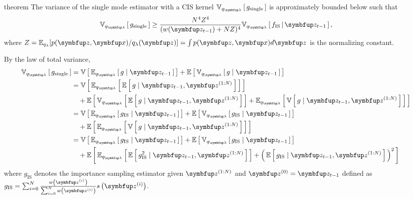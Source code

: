 
\begin{theoremEnd}{theorem}\label{thm:approx_var}
  The variance of the single mode estimator with a CIS kernel $\Vsub{q_{\vlambda}}{g_{\mathrm{single}}}$ is approximately bounded below such that
  \begin{align}
    \Vsub{q_{\vlambda}}{g_{\mathrm{single}}} \geq \frac{N^4 Z^4}{(w(\vz_{t-1}) + NZ)^4} \Vsub{q_{\vlambda}}{ f_{\text{IS}} \,\middle\vert\, \vz_{t-1} },
  \end{align}
  where $Z=\mathbb{E}_{q_\lambda}[p(\vz,\vx)/q_{\lambda}(\vz)]=\int p(\vz,\vx)d\vz$ is the normalizing constant.
\end{theoremEnd}
%
\begin{proofEnd}
  By the law of total variance,
  \begin{align}
    \Vsub{q_{\vlambda}}{g_{\mathrm{single}}}
    &= \V{ \Esub{q_{\vlambda}}{ g \mid \vz_{t-1} }} + \E{\Vsub{q_{\vlambda}}{ g \mid \vz_{t-1}}} \\
    &= \V{
      \Esub{q_{\vlambda}}{
        \E{
          g \mid \vz_{t-1}, \vz^{(1:N)} }
      }
    }\nonumber \\
    &\quad + 
    \E{
      \Vsub{q_{\vlambda}}{
        \E{
          g \mid \vz_{t-1}, \vz^{(1:N)}}
      }
      +
      \Esub{q_{\vlambda}}{
        \V{
          g \mid \vz_{t-1}, \vz^{(1:N)}}
      }
    } \\
    &= \V{
      \Esub{q_{\vlambda}}{
        g_{\mathrm{IS}} \mid \vz_{t-1}
      }
    } 
    +
    \E{
      \Vsub{q_{\vlambda}}{
        g_{\mathrm{IS}} \mid \vz_{t-1}
      }
    }\nonumber \\
    &\quad  +
    \E{
      \Esub{q_{\vlambda}}{
        \V{
          g \mid \vz_{t-1}, \vz^{(1:N)}}
      }
    } \\
    &= \V{
      \Esub{q_{\vlambda}}{
        g_{\mathrm{IS}} \mid \vz_{t-1}
      }
    } 
    +
    \E{
      \Vsub{q_{\vlambda}}{
        g_{\mathrm{IS}} \mid \vz_{t-1}
      }
    }\nonumber \\
    &\quad  +
    \E{
      \Esub{q_{\vlambda}}{
        \E{
          g^2_{\mathrm{IS}} \mid \vz_{t-1}, \vz^{(1:N)}
        }
      }
      +
      {\left(\,
        \E{
          g_{\mathrm{IS}} \mid \vz_{t-1}, \vz^{(1:N)}
        }
      \,\right)}^2
    }
  \end{align}
  where \(g_{\mathrm{IS}}\) denotes the importance sampling estimator given \(\vz^{(1:N)}\) and \(\vz^{(0)} = \vz_{t-1}\) defined as \(g_{\mathrm{IS}} = \sum_{i=0}^N \frac{w\left(\vz^{(i)}\right)}{\sum_{i=0}^N w\left(\vz^{(i)}\right)} s\left(\vz^{(i)}\right) \).



\end{proofEnd}
